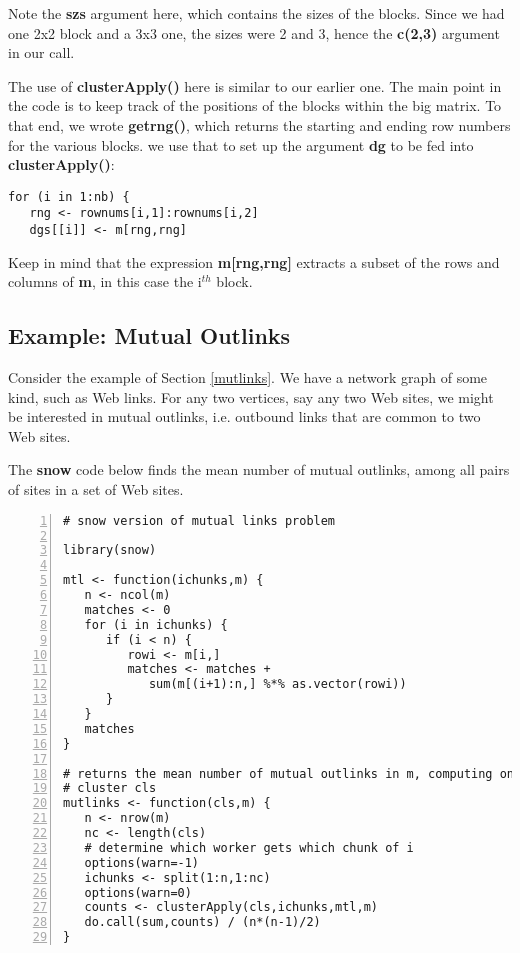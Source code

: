 Note the {\bf szs} argument here, which contains the sizes of the
blocks.  Since we had one 2x2 block and a 3x3 one, the sizes were 2 and
3, hence the {\bf c(2,3)} argument in our call.

The use of {\bf clusterApply()} here is similar to our earlier one.  The
main point in the code is to keep track of the positions of the blocks
within the big matrix.  To that end, we wrote {\bf getrng()}, which
returns the starting and ending row numbers for the various blocks.  we
use that to set up the argument {\bf dg} to be fed into {\bf
clusterApply()}:

\begin{lstlisting}
for (i in 1:nb) {
   rng <- rownums[i,1]:rownums[i,2]
   dgs[[i]] <- m[rng,rng]
\end{lstlisting}

Keep in mind that the expression {\bf m[rng,rng]} extracts a subset
of the rows and columns of {\bf m}, in this case the i$^{th}$ block.

\subsection{Example:  Mutual Outlinks}
\label{rmutlinks}

Consider the example of Section \ref{mutlinks}.  We have
a network graph of some kind, such as Web links.  For any two
vertices, say any two Web sites, we might be interested in mutual
outlinks, i.e. outbound links that are common to two Web sites.

The {\bf snow} code below finds the mean number of mutual outlinks, among
all pairs of sites in a set of Web sites.

\begin{lstlisting}[numbers=left]
# snow version of mutual links problem

library(snow)

mtl <- function(ichunks,m) {
   n <- ncol(m)
   matches <- 0
   for (i in ichunks) {
      if (i < n) {
         rowi <- m[i,]
         matches <- matches +
            sum(m[(i+1):n,] %*% as.vector(rowi))
      }
   }
   matches
}

# returns the mean number of mutual outlinks in m, computing on the
# cluster cls
mutlinks <- function(cls,m) {
   n <- nrow(m)
   nc <- length(cls)
   # determine which worker gets which chunk of i
   options(warn=-1)
   ichunks <- split(1:n,1:nc)
   options(warn=0)
   counts <- clusterApply(cls,ichunks,mtl,m)
   do.call(sum,counts) / (n*(n-1)/2)
}
\end{lstlisting}

